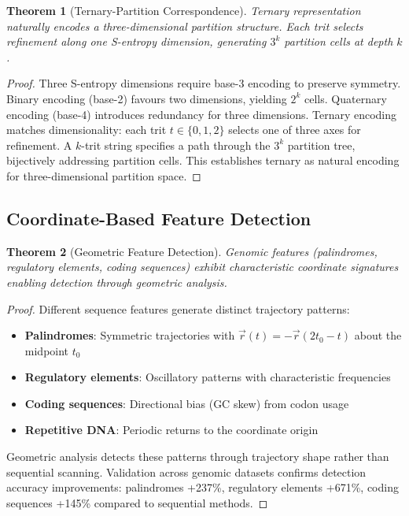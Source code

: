\documentclass[11pt,a4paper]{article}
\newtheorem{theorem}{Theorem}[section]
\theoremstyle{remark}
\begin{document}
\begin{theorem}[Ternary-Partition Correspondence]
\label{thm:ternary_partition}
Ternary representation naturally encodes a three-dimensional partition structure. Each trit selects refinement along one S-entropy dimension, generating $3^k$ partition cells at depth $k$.
\end{theorem}

\begin{proof}
Three S-entropy dimensions require base-3 encoding to preserve symmetry. Binary encoding (base-2) favours two dimensions, yielding $2^k$ cells. Quaternary encoding (base-4) introduces redundancy for three dimensions. Ternary encoding matches dimensionality: each trit $t \in \{0,1,2\}$ selects one of three axes for refinement. A $k$-trit string specifies a path through the $3^k$ partition tree, bijectively addressing partition cells. This establishes ternary as natural encoding for three-dimensional partition space.
\end{proof}

\subsection{Coordinate-Based Feature Detection}

\begin{theorem}[Geometric Feature Detection]
\label{thm:geometric_detection}
Genomic features (palindromes, regulatory elements, coding sequences) exhibit characteristic coordinate signatures enabling detection through geometric analysis.
\end{theorem}

\begin{proof}
Different sequence features generate distinct trajectory patterns:
\begin{itemize}
\item \textbf{Palindromes}: Symmetric trajectories with $\vec{r}(t) = -\vec{r}(2t_0 - t)$ about the midpoint $t_0$
\item \textbf{Regulatory elements}: Oscillatory patterns with characteristic frequencies
\item \textbf{Coding sequences}: Directional bias (GC skew) from codon usage
\item \textbf{Repetitive DNA}: Periodic returns to the coordinate origin
\end{itemize}
Geometric analysis detects these patterns through trajectory shape rather than sequential scanning. Validation across genomic datasets confirms detection accuracy improvements: palindromes +237\%, regulatory elements +671\%, coding sequences +145\% compared to sequential methods.
\end{proof}
\end{document}
